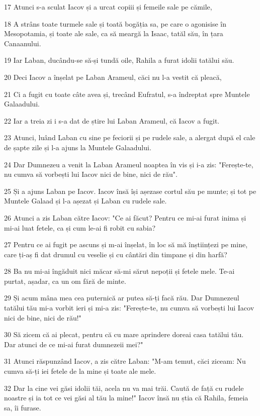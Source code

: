 \par 17 Atunci s-a sculat Iacov și a urcat copiii și femeile sale pe cămile,
\par 18 A strâns toate turmele sale și toată bogăția sa, pe care o agonisise în Mesopotamia, și toate ale sale, ca să meargă la Isaac, tatăl său, în țara Canaanului.
\par 19 Iar Laban, ducându-se să-și tundă oile, Rahila a furat idolii tatălui său.
\par 20 Deci Iacov a înșelat pe Laban Arameul, căci nu l-a vestit că pleacă,
\par 21 Ci a fugit cu toate câte avea și, trecând Eufratul, s-a îndreptat spre Muntele Galaadului.
\par 22 Iar a treia zi i s-a dat de știre lui Laban Arameul, că Iacov a fugit.
\par 23 Atunci, luând Laban cu sine pe feciorii și pe rudele sale, a alergat după el cale de șapte zile și l-a ajuns la Muntele Galaadului.
\par 24 Dar Dumnezeu a venit la Laban Arameul noaptea în vis și i-a zis: "Ferește-te, nu cumva să vorbești lui Iacov nici de bine, nici de rău".
\par 25 Și a ajuns Laban pe Iacov. Iacov însă își așezase cortul său pe munte; și tot pe Muntele Galaad și l-a așezat și Laban cu rudele sale.
\par 26 Atunci a zis Laban către Iacov: "Ce ai făcut? Pentru ce mi-ai furat inima și mi-ai luat fetele, ca și cum le-ai fi robit cu sabia?
\par 27 Pentru ce ai fugit pe ascuns și m-ai înșelat, în loc să mă înștiințezi pe mine, care ți-aș fi dat drumul cu veselie și cu cântări din timpane și din harfă?
\par 28 Ba nu mi-ai îngăduit nici măcar să-mi sărut nepoții și fetele mele. Te-ai purtat, așadar, ca un om fără de minte.
\par 29 Și acum mâna mea cea puternică ar putea să-ți facă rău. Dar Dumnezeul tatălui tău mi-a vorbit ieri și mi-a zis: "Ferește-te, nu cumva să vorbești lui Iacov nici de bine, nici de rău!"
\par 30 Să zicem că ai plecat, pentru că cu mare aprindere doreai casa tatălui tău. Dar atunci de ce mi-ai furat dumnezeii mei?"
\par 31 Atunci răspunzând Iacov, a zis către Laban: "M-am temut, căci ziceam: Nu cumva să-ți iei fetele de la mine și toate ale mele.
\par 32 Dar la cine vei găsi idolii tăi, acela nu va mai trăi. Caută de față cu rudele noastre și ia tot ce vei găsi al tău la mine!" Iacov însă nu știa că Rahila, femeia sa, îi furase.
